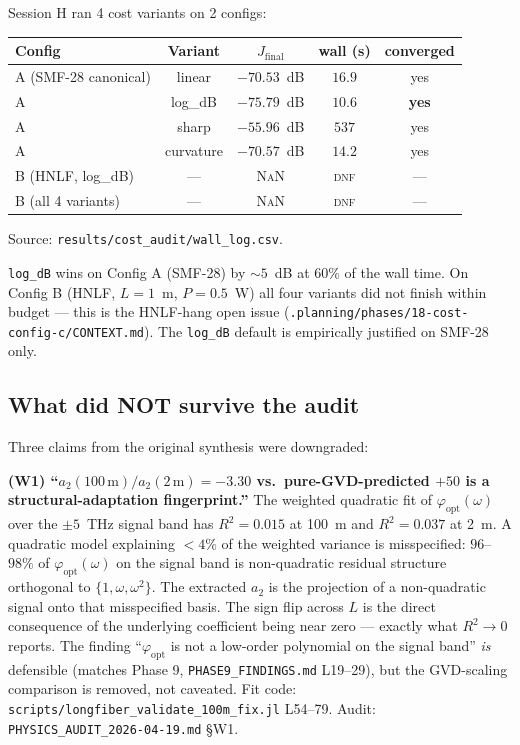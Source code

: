 \documentclass[12pt,a4paper]{article}
\theoremstyle{definition}
\begin{document}
Session H ran 4 cost variants on 2 configs:
\begin{center}
\begin{tabular}{lcccc}
\toprule
Config & Variant & $J_\text{final}$ & wall (s) & converged \\
\midrule
A (SMF-28 canonical) & linear     & $-70.53$~dB & $16.9$ & yes \\
A                    & log\_dB    & $\mathbf{-75.79}$~dB & $\mathbf{10.6}$ & \textbf{yes} \\
A                    & sharp      & $-55.96$~dB & $537$  & yes \\
A                    & curvature  & $-70.57$~dB & $14.2$ & yes \\
B (HNLF, log\_dB)    & --- & \textsc{NaN} & \textsc{dnf} & --- \\
B (all 4 variants)   & --- & \textsc{NaN} & \textsc{dnf} & --- \\
\bottomrule
\end{tabular}
\end{center}
Source: \texttt{results/cost\_audit/wall\_log.csv}.

\begin{advisory}
\texttt{log\_dB} wins on Config A (SMF-28) by $\sim 5$~dB at 60\%
of the wall time. On Config B (HNLF, $L{=}1$~m, $P{=}0.5$~W) all four
variants did not finish within budget --- this is the HNLF-hang open
issue (\texttt{.planning/phases/18-cost-config-c/CONTEXT.md}). The
\texttt{log\_dB} default is empirically justified on SMF-28 only.
\end{advisory}

\subsection{What did NOT survive the audit}
\label{sec:april-wrong}

Three claims from the original synthesis were downgraded:

\textbf{(W1) ``$a_2(100\,\mathrm{m})/a_2(2\,\mathrm{m}) = -3.30$ vs.\ pure-GVD-predicted $+50$ is a structural-adaptation fingerprint.''}
The weighted quadratic fit of $\varphi_\text{opt}(\omega)$ over the
$\pm 5$~THz signal band has $R^2 = 0.015$ at 100~m and $R^2 = 0.037$
at 2~m. A quadratic model explaining $< 4\%$ of the weighted
variance is misspecified: $96$--$98\%$ of $\varphi_\text{opt}(\omega)$
on the signal band is non-quadratic residual structure orthogonal to
$\{1, \omega, \omega^2\}$. The extracted $a_2$ is the projection of
a non-quadratic signal onto that misspecified basis. The sign flip
across $L$ is the direct consequence of the underlying coefficient
being near zero --- exactly what $R^2 \to 0$ reports. The finding ``$\varphi_\text{opt}$ is not a low-order
polynomial on the signal band'' \emph{is} defensible (matches Phase 9,
\texttt{PHASE9\_FINDINGS.md} L19--29), but the
GVD-scaling comparison is removed, not caveated. Fit code:
\texttt{scripts/longfiber\_validate\_100m\_fix.jl} L54--79. Audit:
\texttt{PHYSICS\_AUDIT\_2026-04-19.md} §W1.
\end{document}
